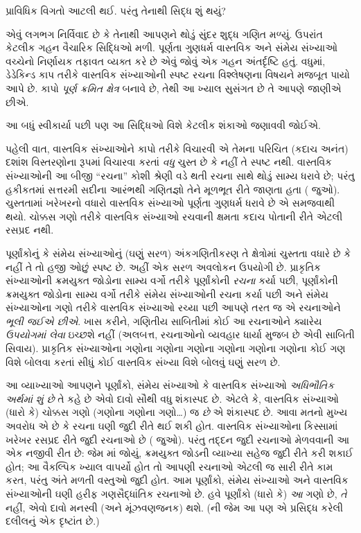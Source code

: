 \documentclass[../../../include/open-logic-section]{subfiles}
\begin{document}

પ્રાવિધિક વિગતો આટલી થઈ. પરંતુ તેનાથી સિદ્ધ શું થયું?

એવું લગભગ નિર્વિવાદ છે કે તેનાથી આપણને થોડું {સુંદર} શુદ્ધ ગણિત
મળ્યું. ઉપરાંત કેટલીક ગહન વૈચારિક સિદ્ધિઓ મળી. પૂર્ણતા ગુણધર્મ
વાસ્તવિક અને સંમેય સંખ્યાઓ વચ્ચેનો નિર્ણાયક તફાવત વ્યક્ત કરે છે એવું
જોવું એક ગહન અંતર્દૃષ્ટિ હતું. વધુમાં, ડેડેકિન્ડ કાપ તરીકે વાસ્તવિક
સંખ્યાઓની સ્પષ્ટ રચના વિશ્લેષણના વિષયને મજબૂત પાયો આપે છે. કાપો
\emph{પૂર્ણ ક્રમિત ક્ષેત્ર} બનાવે છે, તેથી આ ખ્યાલ સુસંગત છે તે આપણે જાણીએ છીએ.

આ બધું સ્વીકાર્યા પછી પણ આ સિદ્ધિઓ વિશે કેટલીક શંકાઓ જણાવવી જોઈએ.

પહેલી વાત, વાસ્તવિક સંખ્યાઓને કાપો તરીકે વિચારવી એ તેમના પરિચિત
(કદાચ અનંત) દશાંશ વિસ્તરણોના રૂપમાં વિચારવા કરતાં \emph{વધુ} ચુસ્ત
છે કે નહીં તે સ્પષ્ટ નથી. વાસ્તવિક સંખ્યાઓની આ બીજી ``રચના'' કોશી
શ્રેણી વડે થતી રચના સાથે થોડું સામ્ય ધરાવે છે; પરંતુ હકીકતમાં
સત્તરમી સદીના આરંભથી ગણિતજ્ઞો તેને મૂળભૂત રીતે જાણતા હતા
( જુઓ). ચુસ્તતામાં ખરેખરનો વધારો વાસ્તવિક સંખ્યાઓ
પૂર્ણતા ગુણધર્મ ધરાવે છે એ સમજવાથી થયો. ચોક્કસ ગણો તરીકે વાસ્તવિક
સંખ્યાઓ રચવાની ક્ષમતા કદાચ પોતાની રીતે એટલી રસપ્રદ નથી.

પૂર્ણાંકોનું કે સંમેય સંખ્યાઓનું (ઘણું સરળ) અંકગણિતીકરણ તે ક્ષેત્રોમાં
ચુસ્તતા વધારે છે કે નહીં તે તો હજી ઓછું સ્પષ્ટ છે. અહીં એક સરળ અવલોકન
ઉપયોગી છે. પ્રાકૃતિક સંખ્યાઓની ક્રમયુક્ત જોડોના સામ્ય વર્ગો તરીકે
પૂર્ણાંકોની \emph{રચના} કર્યા પછી, પૂર્ણાંકોની ક્રમયુક્ત જોડોના સામ્ય
વર્ગો તરીકે સંમેય સંખ્યાઓની રચના કર્યા પછી અને સંમેય સંખ્યાઓના ગણો
તરીકે વાસ્તવિક સંખ્યાઓ રચ્યા પછી આપણે તરત જ એ રચનાઓને \emph{ભૂલી
જઈએ છીએ}. ખાસ કરીને, ગણિતીય સાબિતીમાં કોઈ આ રચનાઓને ક્યારેય
\emph{ઉપયોગમાં લેવા} ઇચ્છશે નહીં (અલબત્ત, રચનાઓનો વ્યવહાર ધાર્યા મુજબ
છે એવી સાબિતી સિવાય). પ્રાકૃતિક સંખ્યાઓના ગણોના ગણોના ગણોના ગણોના
ગણોના ગણોના કોઈ ગણ વિશે બોલવા કરતાં સીધું કોઈ વાસ્તવિક સંખ્યા વિશે
બોલવું ઘણું સરળ છે.
%
%
%

આ વ્યાખ્યાઓ આપણને પૂર્ણાંકો, સંમેય સંખ્યાઓ કે વાસ્તવિક સંખ્યાઓ
\emph{અધિભૌતિક અર્થમાં શું છે} તે કહે છે એવો દાવો સૌથી વધુ
શંકાસ્પદ છે. એટલે કે, વાસ્તવિક સંખ્યાઓ (ધારો કે) ચોક્કસ ગણો
(ગણોના ગણોના ગણો\ldots) જ \emph{છે} એ શંકાસ્પદ છે. આવા મતનો મુખ્ય
અવરોધ એ છે કે રચના ઘણી જુદી રીતે થઈ શકી હોત. વાસ્તવિક સંખ્યાઓના
કિસ્સામાં ખરેખર રસપ્રદ રીતે જુદી રચનાઓ છે ( જુઓ).
પરંતુ તદ્દન જુદી રચનાઓ મેળવવાની આ એક નજીવી રીત છે: જેમ
માં જોયું, ક્રમયુક્ત જોડની વ્યાખ્યા સહેજ જુદી
રીતે કરી શકાઈ હોત; આ વૈકલ્પિક ખ્યાલ વાપર્યો હોત તો આપણી રચનાઓ એટલી
જ સારી રીતે કામ કરત, પરંતુ અંતે મળતી વસ્તુઓ જુદી હોત. આમ પૂર્ણાંકો,
સંમેય સંખ્યાઓ અને વાસ્તવિક સંખ્યાઓની ઘણી હરીફ ગણસૈદ્ધાંતિક રચનાઓ છે.
હવે પૂર્ણાંકો (ધારો કે) \emph{આ} ગણો છે, \emph{તે} નહીં, એવો દાવો
મનસ્વી (અને મૂંઝવણજનક) થશે. (ની જેમ આ પણ
\citealt{Benacerraf1965}એ પ્રસિદ્ધ કરેલી દલીલનું એક દૃષ્ટાંત છે.)
\end{document}
